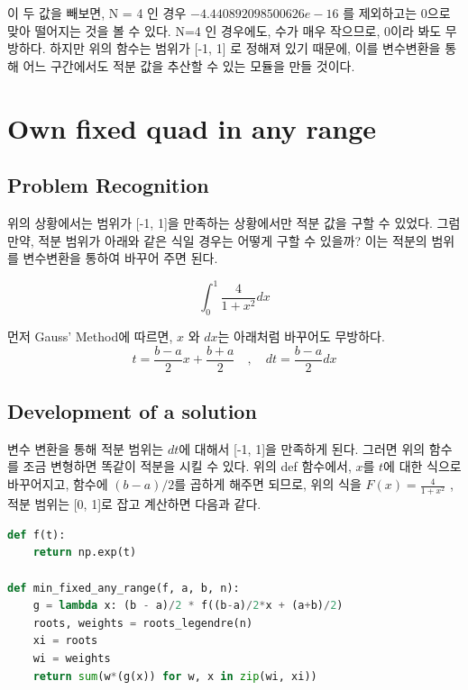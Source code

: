 \documentclass[11pt]{article}
\begin{document}
이 두 값을 빼보면, N = 4 인 경우 $-4.440892098500626e-16$ 를 제외하고는 0으로 맞아 떨어지는 것을 볼 수 있다. N=4 인 경우에도, 수가 매우 작으므로, 0이라 봐도 무방하다. 하지만 위의 함수는 범위가 [-1, 1] 로 정해져 있기 때문에, 이를 변수변환을 통해 어느 구간에서도 적분 값을 추산할 수 있는 모듈을 만들 것이다.

\section{Own fixed quad in any range}
\noindent
\subsection{Problem Recognition} 
위의 상황에서는 범위가 [-1, 1]을 만족하는 상황에서만 적분 값을 구할 수 있었다. 그럼 만약, 적분 범위가 아래와 같은 식일 경우는 어떻게 구할 수 있을까? 이는 적분의 범위를 변수변환을 통하여 바꾸어 주면 된다. 

\begin{equation}
\int_0^1 \frac{4}{1 + x^2} dx
\end{equation}


먼저 Gauss' Method에 따르면, $x$ 와 $dx$는 아래처럼 바꾸어도 무방하다.
\begin{equation}
t = \frac{b - a}{2}x + \frac{b + a}{2}
\quad\mathrm{,}\quad
dt = \frac{b - a}{2} dx
\end{equation}

\subsection{Development of a solution} 
 변수 변환을 통해 적분 범위는 $dt$에 대해서 [-1, 1]을 만족하게 된다. 그러면 위의 함수를 조금 변형하면 똑같이 적분을 시킬 수 있다. 위의 def 함수에서, $x$를 $t$에 대한 식으로 바꾸어지고, 함수에 $(b - a) / 2$를 곱하게 해주면 되므로, 위의 식을 $F(x) = \frac{4}{1 + x^2} $ , 적분 범위는 [0, 1]로 잡고 계산하면 다음과 같다.

\begin{lstlisting}[language=Python]
def f(t):
    return np.exp(t)

def min_fixed_any_range(f, a, b, n):
    g = lambda x: (b - a)/2 * f((b-a)/2*x + (a+b)/2) 
    roots, weights = roots_legendre(n)
    xi = roots
    wi = weights
    return sum(w*(g(x)) for w, x in zip(wi, xi))
\end{lstlisting}
\end{document}
